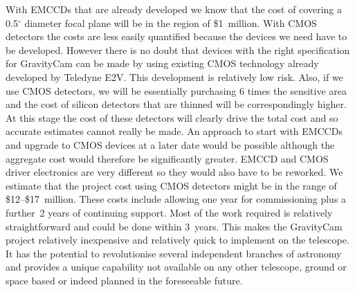 \documentclass{pasa}%
\begin{document}
 
With EMCCDs that are already developed we know that the cost of covering a 0.5$^\circ$ diameter focal plane will be in the region of \$1~million. With CMOS detectors the costs are less easily quantified because the devices we need have to be developed. However there is no doubt that devices with the right specification for GravityCam can be made by using existing CMOS technology already developed by Teledyne E2V. This development is relatively low risk. Also, if we use CMOS detectors, we will be essentially purchasing 6 times the sensitive area and the cost of silicon detectors that are thinned will be correspondingly higher. At this stage the cost of these detectors will clearly drive the total cost and so accurate estimates cannot really be made. An approach to start with EMCCDs and upgrade to CMOS devices at a later date would be possible although the aggregate cost would therefore be significantly greater. EMCCD and CMOS driver electronics are very different so they would also have to be reworked. We estimate that the project cost using CMOS detectors might be in the range of \$12--\$17~million. These costs include allowing one year for commissioning plus a further~2 years of continuing support. Most of the work required is relatively straightforward and could be done within 3~years. This makes the GravityCam project relatively inexpensive and relatively quick to implement on the telescope. It has the potential to revolutionise several independent branches of astronomy and provides a unique capability not available on any other telescope, ground or space based or indeed planned in the foreseeable future.
 
\end{document}
